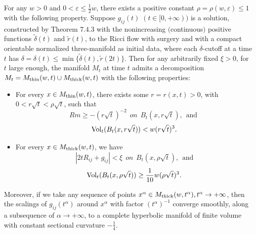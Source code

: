 \begin{theorem}
  \label{thm:cz-surgery-thick-thin-decomposition}

For any $w>0$ and $0 < \varepsilon \leq \frac{1}{2}w$, there
exists a positive constant $\rho = \rho(w,\varepsilon) \leq 1$
with the following property. Suppose $g_{ij}(t)$ $(t \in
[0,+\infty))$ is a solution, constructed by Theorem $7.4.3$ with
the nonincreasing $($continuous$)$ positive functions
$\widetilde{\delta}(t)$ and $\widetilde{r}(t)$, to the Ricci flow
with surgery and with a compact orientable normalized
three-manifold as initial data, where each $\delta$-cutoff at a
time $t$ has $\delta=\delta(t) \leq \min
\{\widetilde{\delta}(t),\widetilde{r}(2t)\}$. Then for any
arbitrarily fixed $\xi >0$, for $t$ large enough, the manifold
$M_t$ at time $t$ admits a decomposition $M_t=M_{\rm
thin}(w,t)\cup M_{\rm thick}(w,t)$ with the following properties:
\begin{itemize}
\item[(a)] For every $x\in M_{\rm thin}(w,t)$, there exists some
$r=r(x,t)>0$, with $0<r\sqrt{t}<\rho\sqrt{t}$, such that
$$
Rm\geq -(r\sqrt{t})^{-2} \ \ on \ \ B_t(x,r\sqrt{t}), \ \
\mbox{and }
$$
$$
\operatorname{Vol}_t(B_t(x,r\sqrt{t}))<w(r\sqrt{t})^3.
$$
\item[(b)] For every $x\in M_{\rm thick}(w,t)$, we have
$$
|2tR_{ij}+g_{ij}|<\xi\ \ on \ \ B_t(x,\rho\sqrt{t}), \ \ \mbox{and
}
$$
$$
\operatorname{Vol}_t(B_t(x,\rho\sqrt{t}))\geq \frac{1}{10}w(\rho\sqrt{t})^3.
$$
\end{itemize}
Moreover, if we take any sequence of points $x^{\alpha}\in M_{\rm
thick}(w,t^{\alpha}),t^{\alpha}\rightarrow+\infty$, then the
scalings of $g_{ij}(t^{\alpha})$ around $x^{\alpha}$ with factor
$(t^{\alpha})^{-1}$ converge smoothly, along a subsequence of
$\alpha\rightarrow+\infty$, to a complete hyperbolic manifold of
finite volume with constant sectional curvature $-\frac{1}{4}$.
\end{theorem}

